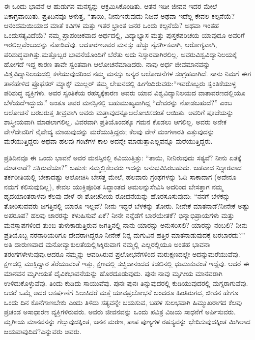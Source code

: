 ಈ ಒಂದು ಭಾವನೆ ಆ ಹುಡುಗನ ಮನಸ್ಸನ್ನು ಆಕ್ರಮಿಸಿಕೊಂಡಿತು. ಆತನ ಇಡೀ ಜೀವನ ಇದರ ಮೇಲೆ ಏಕಾಗ್ರವಾಯಿತು. ಪ್ರತಿದಿನವೂ ಅಳುತ್ತ, “ತಾಯಿ, ನೀನು\break ಇರುವುದು ನಿಜವೆ ಅಥವಾ ಇದೆಲ್ಲ ಕೇವಲ ಕಲ್ಪನೆಯೆ? ಆನಂದಮಯಿಯಾದ ಮಾತೆ ಕವಿಗಳ ಮತ್ತು ಇತರ ಭ್ರಾಂತ ಜನರ ಒಂದು ಕಲ್ಪನೆಯೆ? ಅಥವಾ ಇಂತಹ ಒಂದು\break ಸತ್ಯವಿದೆಯೆ? ನಮ್ಮ ಪ್ರಾಪಂಚಿಕವಾದ ಅರ್ಥದಲ್ಲಿ, ವಿದ್ಯಾಭ್ಯಾಸ ಮತ್ತು ಪುಸ್ತಕ\break ಪರಿಚಯ ಯಾವುದೂ ಅವರಿಗೆ ಇರಲಿಲ್ಲವೆಂಬುದನ್ನು ನೋಡಿದೆವು. ಆದಕಾರಣ\break ಅವರ ಮನಸ್ಸು ಹೆಚ್ಚು ನೈಸರ್ಗಿಕವಾಗಿ, ಆರೋಗ್ಯವಾಗಿ, ಪರಿಶುದ್ಧವಾಗಿತ್ತು.\break ಮತ್ತೊಬ್ಬರ ಭಾವನೆಯೊಂದಿಗೆ ಬೆರೆತು ಅದು ನಿಸ್ಸಾರವಾಗಿರಲಿಲ್ಲ. ಅವರು\break ವಿಶ್ವವಿದ್ಯಾನಿಲಯಕ್ಕೆ ಹೋಗದೆ ಇದ್ದ ಕಾರಣ ತಾವೇ ಸ್ವಂತವಾಗಿ ಆಲೋಚನೆ\break ಮಾಡಿದರು. ನಾವು ಅರ್ಧ ಜೀವಮಾನವನ್ನು ವಿಶ್ವವಿದ್ಯಾನಿಲಯದಲ್ಲಿ ಕಳೆಯುವುದ\-ರಿಂದ ನಮ್ಮ ಮನಸ್ಸು ಅನ್ಯರ ಆಲೋಚನೆಗಳ ಸಂಗ್ರಹವಾಗಿದೆ. ನಾನು ನಿಮಗೆ ಈಗ ತಾನೆ\break ಹೇಳಿದ ಪ್ರೊಫೆಸರ್​ ಮ್ಯಾಕ್ಸ್ ಮುಲ್ಲರ್​ ತಮ್ಮ ಲೇಖನದಲ್ಲಿ ಹೀಗೆಂದಿರುವರು:\break “ಇವರೊಬ್ಬರು ಸ್ವಂತಿಕೆಯುಳ್ಳ ಪರಿಶುದ್ಧ ವ್ಯಕ್ತಿಗಳು. ಅವರ ಸ್ವಂತಿಕೆಯ ರಹಸ್ಯಕ್ಕೆ\break ಕಾರಣ ಅವರು ಯಾವ ವಿಶ್ವವಿದ್ಯಾನಿಲಯದ ವಾತಾವರಣದಲ್ಲಿಯೂ ಬೆಳೆಯದೆ\break ಇದ್ದುದು.” ಅಂತೂ ಅವರ ಮನಸ್ಸಿನಲ್ಲಿ ಬಹುಮುಖ್ಯವಾಗಿದ್ದ “ದೇವರನ್ನು ನೋಡಬಹುದೆ?” ಎಂಬ ಆಲೋಚನೆ ಬರಬರುತ್ತ ತೀವ್ರವಾಗಿ ಅವರು ಮತ್ತಾವುದನ್ನೂ\break ಆಲೋಚಿಸದಂತೆ ಆಯಿತು. ಅವರಿಗೆ ಪೂಜೆಯನ್ನು ಶಾಸ್ತ್ರೀಯವಾಗಿ ಮಾಡಲಾಗಲಿಲ್ಲ. ವಿವರವಾಗಿ ಪ್ರತಿಯೊಂದಕ್ಕೂ ಗಮನ ಕೊಡಲು ಆಗಲಿಲ್ಲ. ಅವರು ಅನೇಕ ವೇಳೆ\break ದೇವರಿಗೆ ನೈವೇದ್ಯ ಮಾಡುವುದನ್ನು ಮರೆಯುತ್ತಿದ್ದರು; ಕೆಲವು ವೇಳೆ ಮಂಗಳಾರತಿ ಎತ್ತುವುದನ್ನು ಮರೆಯುತ್ತಿದ್ದರು ಅಥವಾ ಹಲವು ಗಂಟೆಗಳ ಕಾಲ ಅದನ್ನೇ ಮಾಡುತ್ತಾ\break ಎಲ್ಲವನ್ನೂ ಮರೆಯುತ್ತಿದ್ದರು.

ಪ್ರತಿದಿನವೂ ಈ ಒಂದು ಭಾವನೆ ಅವರ ಮನಸ್ಸಿನಲ್ಲಿ ಕವಿಯುತ್ತಿತ್ತು: “ತಾಯಿ, ನೀನಿರುವುದು ಸತ್ಯವೆ? ನೀನು ಏತಕ್ಕೆ ಮಾತನಾಡೆ? ಸತ್ತಿರುವೆಯಾ?” ಬಹುಶಃ ನಮ್ಮಲ್ಲಿ\break ಕೆಲವರು ಇದನ್ನು ಅನುಭವಿಸಿರಬಹುದು. ಜಡವಾದ ನಿಸ್ಸಾರವಾದ ತರ್ಕರೀತಿಯಲ್ಲಿ ಬೇಕಾದಷ್ಟು ಆಲೋಚಿಸಿ ಬೇಸತ್ತ ಮೇಲೆ, ಹಲವಾರು ಗ್ರಂಥಗಳನ್ನು ಓದಿ ಸಾಕಾದಾಗ (ಅವೇನೂ ನಮಗೆ ಕಲಿಸುವುದಿಲ್ಲ), ಕೇವಲ ಯುಕ್ತಿಪೂರಿತ ಸಿದ್ಧಾಂತದ ಅಮಲನ್ನು\break ಸೇವಿಸಿ ಅದರಿಂದ ಬೇಸತ್ತಾಗ ನಮ್ಮ ಹೃದಯಾಂತರಾಳವು ಕೆಲವು ವೇಳೆ ಈ ಶೋಚ\-ನೀಯ ರೋದನೆಯನ್ನು ಹೊರಸೂಸುವುದು: “ನನಗೆ ಬೆಳಕನ್ನು ತೋರಿಸುವವರು ಜಗತ್ತಿನಲ್ಲಿ ಯಾರೂ ಇಲ್ಲವೆ? ನೀನು ಇದ್ದರೆ ಬೆಳಕನ್ನು ತೋರು. ನೀನೇಕೆ ಮಾತನಾಡೆ?\break ನೀನೇಕೆ ಅಷ್ಟು ಅಪರೂಪ? ಹಲವು ಚಾರರನ್ನು ಕಳುಹಿಸುವೆ ಏಕೆ? ನೀನೇ ನನ್ನೆಡೆಗೆ ಬಾರೆಯೇತಕೆ? ಭಿನ್ನಾಭಿಪ್ರಾಯಗಳು ಮತ್ತು ಮನಸ್ತಾಪಗಳಿಂದ ತುಂಬಿ ತುಳುಕಾಡುತ್ತಿರುವ ಜಗತ್ತಿನಲ್ಲಿ ನಾನು ಯಾರನ್ನು ಅನುಸರಿಸಲಿ? ಯಾರನ್ನು ನಂಬಲಿ? ನೀನು ಪ್ರತಿಯೊಬ್ಬ ನರನಾರಿಯರಿಗೂ ದೇವರಾಗಿದ್ದರೂ ನೀನೇಕೆ ನಿನ್ನ ಮಗುವಿನ ಹತ್ತಿರ ಮಾತನಾಡುವುದಕ್ಕೆ ಬರಬಾರದು?” ಅತಿ ದಾರುಣವಾದ ಮನೋವ್ಯಾಕುಲತೆಯಲ್ಲಿ\break ಸಿಕ್ಕಿರುವಾಗ ನಮ್ಮಲ್ಲಿ ಎಲ್ಲರಲ್ಲಿಯೂ ಅಂತಹ ಭಾವನಾ ತರಂಗಗಳೇಳುವುವು.\break ಆದರೂ ನಮ್ಮನ್ನು ಆವರಿಸಿರುವ ಪ್ರಲೋಭನೆಗಳಿಂದ ಮರುಕ್ಷಣದಲ್ಲೇ ಅದನ್ನು\break ಮರೆಯುವೆವು. ಕ್ಷಣದಲ್ಲಿ ಮುಕ್ತಿದ್ವಾರ ತೆರೆಯುವಂತೆ ಇತ್ತು, ಕ್ಷಣದಲ್ಲಿ ಸಚ್ಚಿದಾನಂದದ ಕಡಲಿನಲ್ಲಿ ಧುಮುಕುವಂತೆ ಇದ್ದೆವು. ಆದರೆ ಈ ಮಾನವನ ಮೃಗೀಯತೆ ದೈವಿಕ\break ಭಾವನೆಯನ್ನು ಹೊರದೂಡುವುದು. ಪುನಃ ನಾವು ಮೃಗೀಯ ಮಾನವರಾಗಿ ಉಳಿದುಕೊಳ್ಳುವೆವು. ತಿಂದು ಕುಡಿದು ಸಾಯುವೆವು. ಪುನಃ ಪುನಃ ತಿನ್ನುವುದರಲ್ಲಿ ಕುಡಿಯುವುದರಲ್ಲಿ ಮಗ್ನರಾಗುವೆವು. ಆದರೆ ಒಮ್ಮೆ ಅದರ ಆಕರ್ಷಣೆಗೆ ಸಿಲುಕಿದರೆ ಮತ್ತೆ ಯಾವ\break ಪ್ರಲೋಭನೆ ಬಂದರೂ ಹಿಂತಿರುಗದ, ಜೀವನ ಹೇಗೂ ಒಂದು ದಿನ ಕೊನೆಗಾಣಬೇಕು ಎಂದು ತಿಳಿದು ಸತ್ಯವನ್ನೇ ಬಯಸುವ, ಬಹಳ ಸುಲಭವಾಗಿ ಹಿಮ್ಮುಖರಾಗದ ಕೆಲವು ಪ್ರಚಂಡ ಅಸಾಧಾರಣ ವ್ಯಕ್ತಿಗಳಿರುವರು. ಅವರು ಜೀವನವನ್ನು ಒಂದು ಪವಿತ್ರ ವಿಜಯ ಸಾಧನೆಗೆ ಅರ್ಪಿಸುವರು. ಮೃಗೀಯ ಮಾನವನನ್ನು ಗೆಲ್ಲುವುದಕ್ಕಿಂತ, ಜನನ ಮರಣ, ಪಾಪ ಪುಣ್ಯಗಳ ರಹಸ್ಯವನ್ನು ಭೇದಿಸುವುದಕ್ಕಿಂತ ಮಿಗಿಲಾದ ಜಯವಾವುದಿದೆ?\break ಎನ್ನುವರು ಅವರು.


